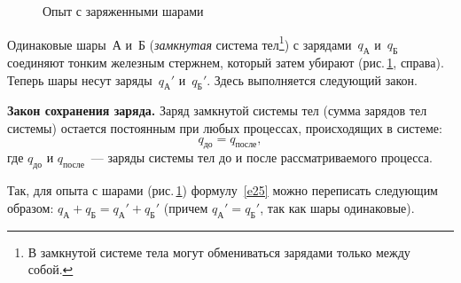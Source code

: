 \documentclass[main.tex]{subfiles}
\begin{document}
\begin{NoHyper}
\begin{figure}[H]
\caption{Опыт с заряженными шарами}
\label{fig:p95}
\end{figure}

Одинаковые шары~А и~Б (\emph{замкнутая} система тел\footnote{В замкнутой системе тела могут обмениваться зарядами только между собой.}) с зарядами~$q_\text{А}^{\phantom{'}}$ и~$q_\text{Б}^{\phantom{'}}$ соединяют тонким железным стержнем, который затем убирают (рис.\,\ref{fig:p95}, справа). Теперь шары несут заряды~$q_\text{А}'$ и~$q_\text{Б}'$. Здесь выполняется следующий закон.

%
\begin{law}
    \textbf{Закон сохранения заряда.} Заряд замкнутой системы тел (сумма зарядов тел системы) остается постоянным при любых процессах, происходящих в системе:
    \begin{equation}
        \label{e25}
        q_\text{до}=q_\text{после},
    \end{equation}
    где $q_\text{до}$ и $q_\text{после}$~--- заряды системы тел до и после рассматриваемого процесса.
\end{law}
%
Так, для опыта с шарами (рис.\,\ref{fig:p95}) формулу~\eqref{e25} можно переписать следующим образом: $q_\text{А}^{\phantom{'}}+q_\text{Б}^{\phantom{'}}=q_\text{А}'+q_\text{Б}'$ (причем $q_\text{А}'=q_\text{Б}'$, так как шары одинаковые).





\end{NoHyper}
\end{document}

